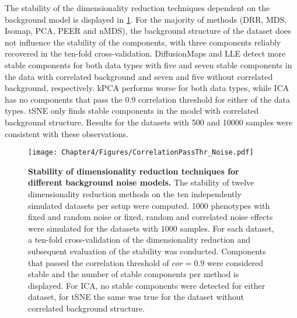 The stability of the dimensionality reduction techniques dependent on the background model is displayed in \cref{fig:cor-noise}. For the majority of methods (DRR, MDS, Isomap, PCA, PEER and nMDS), the background structure of the dataset does not influence the stability of the components, with three components reliably recovered in the ten-fold cross-validation. DiffusionMaps and LLE detect more stable components for both data types with five and seven stable components in the data with correlated background and seven and five without correlated background, respectively. kPCA performs worse for both data types, while ICA has no components that pass the \num{0.9} correlation threshold for either of the data types. tSNE only finds stable components in the model with correlated background structure.  Results for the datasets with \num{500} and \num{10000} samples were consistent with these observations.

\begin{figure}[hbtp]
	\centering
	\texttt{[image: Chapter4/Figures/CorrelationPassThr\_Noise.pdf]}
	\caption[\textbf{Stability of dimensionality reduction techniques for different background noise models.}]{\textbf{Stability of dimensionality reduction techniques for different background noise models. }The stability of twelve dimensionality reduction methods on the ten independently simulated datasets per setup were computed. \num{1000} phenotypes with fixed and random noise or fixed, random and correlated noise effects were simulated for the datasets with \numlist{1000} samples. For each dataset, a ten-fold cross-validation of the dimensionality reduction and subsequent evaluation of the stability was conducted. Components that passed the correlation threshold of \(cor=0.9\) were considered stable and the number of stable components per method is displayed. For ICA, no stable components were detected for either dataset, for tSNE the same was true for the dataset without correlated background structure.} 
	 	\label{fig:cor-noise}
\end{figure}

